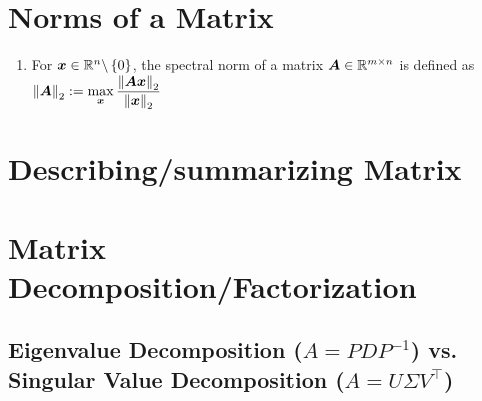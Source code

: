 \section{Norms of a Matrix}

\begin{enumerate}
    \item \begin{definition}
        For $\bm{x} \in \mathbb{R}^n\backslash \left\{0\right\}$, the spectral norm of a matrix $\bm{A} \in \mathbb{R}^{m\times n}$ is defined as
        $
            \left\| \bm{A} \right\|_2
            := \displaystyle\max_{\bm{x}} \dfrac{\left\| \bm{Ax} \right\|_2}{\left\| \bm{x} \right\|_2}
        $
        \hfill \cite{mfml/book/mml/Deisenroth-Faisal-Ong}
    \end{definition}
\end{enumerate}





\section{Describing/summarizing Matrix}







\section{Matrix Decomposition/Factorization}





\subsection{Eigenvalue Decomposition ($A = P DP ^{-1}$) vs. Singular Value Decomposition ($A = U \Sigma V^\top$)}


